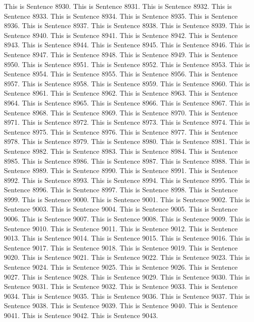 \documentclass{article}
\begin{document}
This is Sentence 8930.
This is Sentence 8931.
This is Sentence 8932.
This is Sentence 8933.
This is Sentence 8934.
This is Sentence 8935.
This is Sentence 8936.
This is Sentence 8937.
This is Sentence 8938.
This is Sentence 8939.
This is Sentence 8940.
This is Sentence 8941.
This is Sentence 8942.
This is Sentence 8943.
This is Sentence 8944.
This is Sentence 8945.
This is Sentence 8946.
This is Sentence 8947.
This is Sentence 8948.
This is Sentence 8949.
This is Sentence 8950.
This is Sentence 8951.
This is Sentence 8952.
This is Sentence 8953.
This is Sentence 8954.
This is Sentence 8955.
This is Sentence 8956.
This is Sentence 8957.
This is Sentence 8958.
This is Sentence 8959.
This is Sentence 8960.
This is Sentence 8961.
This is Sentence 8962.
This is Sentence 8963.
This is Sentence 8964.
This is Sentence 8965.
This is Sentence 8966.
This is Sentence 8967.
This is Sentence 8968.
This is Sentence 8969.
This is Sentence 8970.
This is Sentence 8971.
This is Sentence 8972.
This is Sentence 8973.
This is Sentence 8974.
This is Sentence 8975.
This is Sentence 8976.
This is Sentence 8977.
This is Sentence 8978.
This is Sentence 8979.
This is Sentence 8980.
This is Sentence 8981.
This is Sentence 8982.
This is Sentence 8983.
This is Sentence 8984.
This is Sentence 8985.
This is Sentence 8986.
This is Sentence 8987.
This is Sentence 8988.
This is Sentence 8989.
This is Sentence 8990.
This is Sentence 8991.
This is Sentence 8992.
This is Sentence 8993.
This is Sentence 8994.
This is Sentence 8995.
This is Sentence 8996.
This is Sentence 8997.
This is Sentence 8998.
This is Sentence 8999.
This is Sentence 9000.
This is Sentence 9001.
This is Sentence 9002.
This is Sentence 9003.
This is Sentence 9004.
This is Sentence 9005.
This is Sentence 9006.
This is Sentence 9007.
This is Sentence 9008.
This is Sentence 9009.
This is Sentence 9010.
This is Sentence 9011.
This is Sentence 9012.
This is Sentence 9013.
This is Sentence 9014.
This is Sentence 9015.
This is Sentence 9016.
This is Sentence 9017.
This is Sentence 9018.
This is Sentence 9019.
This is Sentence 9020.
This is Sentence 9021.
This is Sentence 9022.
This is Sentence 9023.
This is Sentence 9024.
This is Sentence 9025.
This is Sentence 9026.
This is Sentence 9027.
This is Sentence 9028.
This is Sentence 9029.
This is Sentence 9030.
This is Sentence 9031.
This is Sentence 9032.
This is Sentence 9033.
This is Sentence 9034.
This is Sentence 9035.
This is Sentence 9036.
This is Sentence 9037.
This is Sentence 9038.
This is Sentence 9039.
This is Sentence 9040.
This is Sentence 9041.
This is Sentence 9042.
This is Sentence 9043.
\end{document}
